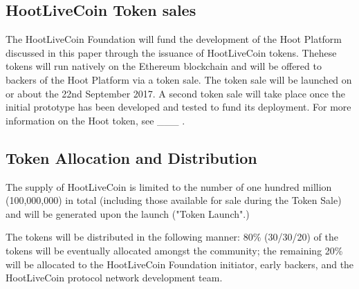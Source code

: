 \documentclass{article}
\begin{document}
\subsection{HootLiveCoin Token sales} %
\label{sub:hoot_token_sales}
The HootLiveCoin Foundation will fund the development of the Hoot Platform discussed in this paper through the issuance of HootLiveCoin tokens. Thehese tokens will run natively on the Ethereum blockchain and will be offered to backers of the Hoot Platform via a token sale. The token sale will be launched on or about the 22nd September 2017. A second token sale will take place once the initial prototype has been developed and tested to fund its deployment. For more information on the Hoot token, see \_\_\_ .

\subsection{Token Allocation and Distribution} %
\label{sub:token_allocation_and_distribution}
 The supply of HootLiveCoin is limited to the number of one hundred million (100,000,000) in total (including those available for sale during the Token Sale) and will be generated upon the launch ("Token Launch".)

 The tokens will be distributed in the following manner:
80\% (30/30/20) of the tokens will be eventually allocated amongst the community; the remaining 20\% will be allocated to the HootLiveCoin Foundation initiator, early backers, and the HootLiveCoin protocol network development team.
\end{document}
